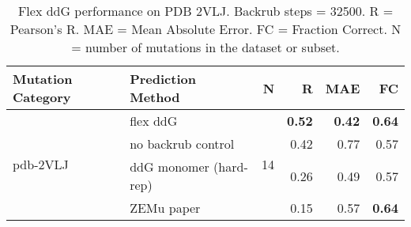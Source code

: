 \begin{table}
  \begin{tabular}{llrrrr}
\toprule
Mutation Category &       Prediction Method &   N &    R &  MAE &   FC \\
\midrule
 \multirow{ 4}{*}{pdb-2VLJ} & flex ddG & \multirow{ 4}{*}{14} & \textbf{0.52} & \textbf{0.42} & \textbf{0.64}  \\
 & no backrub control & & 0.42 & 0.77 & 0.57  \\
 & ddG monomer (hard-rep) & & 0.26 & 0.49 & 0.57  \\
 & ZEMu paper & & 0.15 & 0.57 & \textbf{0.64}  \\
\bottomrule
\end{tabular}
  \caption[Flex ddG performance on PDB 2VLJ]{
    Flex ddG performance on PDB 2VLJ. Backrub steps = 32500. R = Pearson's R. MAE = Mean Absolute Error. FC = Fraction Correct. N = number of mutations in the dataset or subset.
  } \label{tab:table-pdb-2VLJ}
\end{table}
